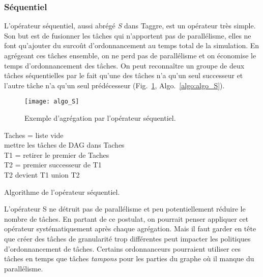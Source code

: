 \subsubsection{Séquentiel}
L'opérateur séquentiel, aussi abrégé {\em S} dans Taggre, est un opérateur très simple.
%
Son but est de fusionner les tâches qui n'apportent pas de parallélisme, elles ne font qu'ajouter du surcoût d'ordonnancement au temps total de la simulation.
%
En agrégeant ces tâches ensemble, on ne perd pas de parallélisme et on économise le temps d'ordonnancement des tâches.
%
On peut reconnaître un groupe de deux tâches séquentielles par le fait qu'une des tâches n'a qu'un seul successeur et l'autre tâche n'a qu'un seul prédécesseur (Fig.~\ref{fig:algo_S}, Algo.~\ref{algo:algo_S}).


\begin{figure}[!h]
  \centering
  \texttt{[image: algo\_S]}
  \caption{Exemple d'agrégation par l'opérateur séquentiel.}
  \label{fig:algo_S}
\end{figure}

\begin{algorithm}
  {\sc Taches} = liste vide \\
  mettre les tâches de DAG dans {\sc Taches} \\
   {
    {\sc T1} = retirer le premier de {\sc Taches} \\
     {
      {\sc T2} = premier successeur de {\sc T1} \\
       {
        {\sc T2} devient {\sc T1} union {\sc T2}\\
      }
    }
  }
  \caption{Algorithme de l'opérateur séquentiel.}
  \label{algo:algo_S}
\end{algorithm}

L'opérateur S ne détruit pas de parallélisme et peu potentiellement réduire le nombre de tâches.
%
En partant de ce postulat, on pourrait penser appliquer cet opérateur systématiquement après chaque agrégation.
%
Mais il faut garder en tête que créer des tâches de granularité trop différentes peut impacter les politiques d'ordonnancement de tâches.
%
Certains ordonnanceurs pourraient utiliser ces tâches en temps que tâches {\em tampons} pour les parties du graphe où il manque du parallélisme.
